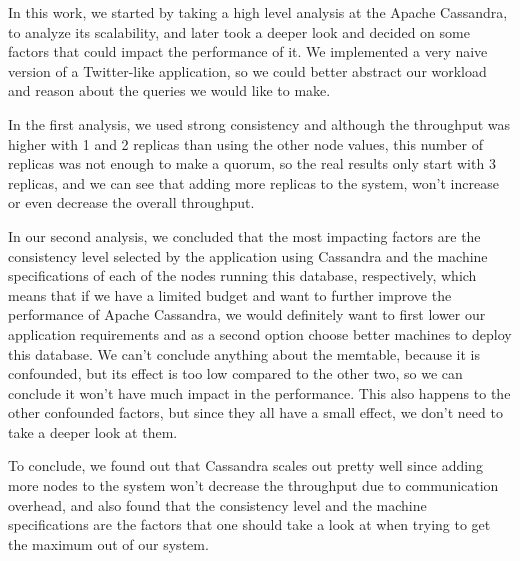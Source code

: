 \documentclass[runningheads]{llncs}
\begin{document}
In this work, we started by taking a high level analysis at the Apache Cassandra, to analyze its scalability, and later took a deeper look and decided on some factors that could impact the performance of it. We implemented a very naive version of a Twitter-like application, so we could better abstract our workload and reason about the queries we would like to make.

In the first analysis, we used strong consistency and although the throughput was higher with 1 and 2 replicas than using the other node values, this number of replicas was not enough to make a quorum, so the real results only start with 3 replicas, and we can see that adding more replicas to the system, won't increase or even decrease the overall throughput.

In our second analysis, we concluded that the most impacting factors are the consistency level selected by the application using Cassandra and the machine specifications of each of the nodes running this database, respectively, which means that if we have a limited budget and want to further improve the performance of Apache Cassandra, we would definitely want to first lower our application requirements and as a second option choose better machines to deploy this database. We can't conclude anything about the memtable, because it is confounded, but its effect is too low compared to the other two, so we can conclude it won't have much impact in the performance. This also happens to the other confounded factors, but since they all have a small effect, we don't need to take a deeper look at them.

To conclude, we found out that Cassandra scales out pretty well since adding more nodes to the system won't decrease the throughput due to communication overhead, and also found that the consistency level and the machine specifications are the factors that one should take a look at when trying to get the maximum out of our system.

\printbibliography
\end{document}
